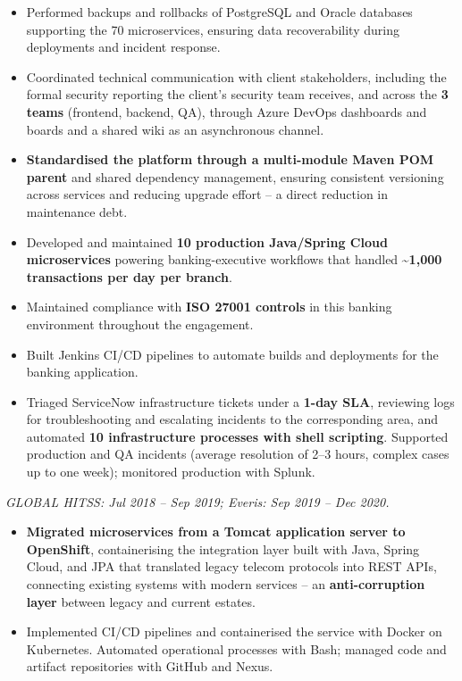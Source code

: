 {\begin{itemize}
    \item Performed backups and rollbacks of PostgreSQL and Oracle databases supporting the 70 microservices, ensuring data recoverability during deployments and incident response.
    \item Coordinated technical communication with client stakeholders, including the formal security reporting the client's security team receives, and across the \textbf{3 teams} (frontend, backend, QA), through Azure DevOps dashboards and boards and a shared wiki as an asynchronous channel.
\end{itemize}

\begin{itemize}
    \item \textbf{Standardised the platform through a multi-module Maven POM parent} and shared dependency management, ensuring consistent versioning across services and reducing upgrade effort -- a direct reduction in maintenance debt.
    \item Developed and maintained \textbf{10 production Java/Spring Cloud microservices} powering banking-executive workflows that handled \textbf{\textasciitilde 1{,}000 transactions per day per branch}.
    \item Maintained compliance with \textbf{ISO 27001 controls} in this banking environment throughout the engagement.
    \item Built Jenkins CI/CD pipelines to automate builds and deployments for the banking application.
    \item Triaged ServiceNow infrastructure tickets under a \textbf{1-day SLA}, reviewing logs for troubleshooting and escalating incidents to the corresponding area, and automated \textbf{10 infrastructure processes with shell scripting}. Supported production and QA incidents (average resolution of 2--3 hours, complex cases up to one week); monitored production with Splunk.
\end{itemize}

\textit{GLOBAL HITSS: Jul 2018 -- Sep 2019; Everis: Sep 2019 -- Dec 2020.}\par\vspace{3pt}
\begin{itemize}
    \item \textbf{Migrated microservices from a Tomcat application server to OpenShift}, containerising the integration layer built with Java, Spring Cloud, and JPA that translated legacy telecom protocols into REST APIs, connecting existing systems with modern services -- an \textbf{anti-corruption layer} between legacy and current estates.
    \item Implemented CI/CD pipelines and containerised the service with Docker on Kubernetes. Automated operational processes with Bash; managed code and artifact repositories with GitHub and Nexus.
\end{itemize}

}
